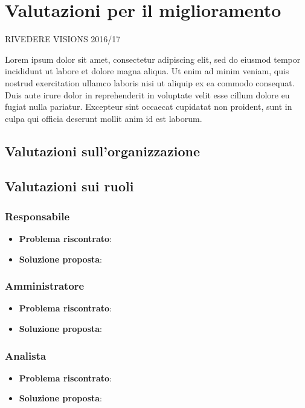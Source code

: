 \newpage
\section{Valutazioni per il miglioramento}

	RIVEDERE VISIONS 2016/17

	Lorem ipsum dolor sit amet, consectetur adipiscing elit, sed do eiusmod tempor incididunt ut labore et dolore magna aliqua. Ut enim ad minim veniam, quis nostrud exercitation ullamco laboris nisi ut aliquip ex ea commodo consequat. Duis aute irure dolor in reprehenderit in voluptate velit esse cillum dolore eu fugiat nulla pariatur. Excepteur sint occaecat cupidatat non proident, sunt in culpa qui officia deserunt mollit anim id est laborum.

	\subsection{Valutazioni sull'organizzazione}
	\subsection{Valutazioni sui ruoli}
	
		\subsubsection{Responsabile}
			\begin{itemize}
				\item \textbf{Problema riscontrato}:
				\item \textbf{Soluzione proposta}:
			\end{itemize}

		\subsubsection{Amministratore}
			\begin{itemize}
				\item \textbf{Problema riscontrato}:
				\item \textbf{Soluzione proposta}:
			\end{itemize}

		\subsubsection{Analista}
			\begin{itemize}
				\item \textbf{Problema riscontrato}:
				\item \textbf{Soluzione proposta}:
			\end{itemize}


